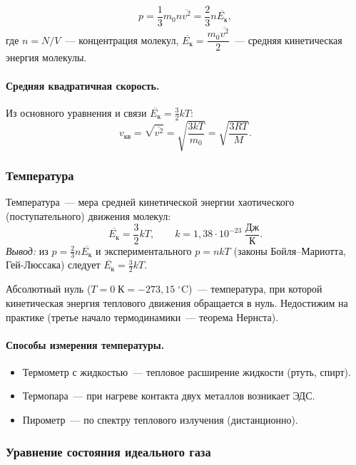 \documentclass[12pt]{article}
\begin{document}
\[
	\boxed{p = \frac{1}{3} m_0 n \overline{v^2} = \frac{2}{3} n \overline{E_{\text{к}}}},
\]
где $n = N/V$~--- концентрация молекул, $\overline{E_{\text{к}}} = \dfrac{m_0 \overline{v^2}}{2}$~--- средняя кинетическая энергия молекулы.

\paragraph{Средняя квадратичная скорость.}
Из основного уравнения и связи $\overline{E_{\text{к}}} = \frac{3}{2}kT$:
\[
	v_{\text{кв}} = \sqrt{\overline{v^2}} = \sqrt{\frac{3kT}{m_0}} = \sqrt{\frac{3RT}{M}}.
\]

\subsubsection{Температура}

\begin{definition}
	Температура~--- мера средней кинетической энергии хаотического (поступательного) движения молекул:
	\[
		\overline{E_{\text{к}}} = \frac{3}{2} kT, \qquad k = 1{,}38 \cdot 10^{-23} \; \frac{\text{Дж}}{\text{К}}.
	\]
	\textit{Вывод:} из $p = \frac{2}{3}n\overline{E_{\text{к}}}$ и экспериментального $p = nkT$ (законы Бойля--Мариотта, Гей-Люссака) следует $\overline{E_{\text{к}}} = \frac{3}{2}kT$.
\end{definition}

Абсолютный нуль ($T = 0 \; \text{К} = -273{,}15\;{^\circ}\text{C}$)~--- температура, при которой кинетическая энергия теплового движения обращается в нуль. Недостижим на практике (третье начало термодинамики~--- теорема Нернста).

\paragraph{Способы измерения температуры.}
\begin{itemize}
	\item Термометр с жидкостью~--- тепловое расширение жидкости (ртуть, спирт).
	\item Термопара~--- при нагреве контакта двух металлов возникает ЭДС.
	\item Пирометр~--- по спектру теплового излучения (дистанционно).
\end{itemize}

\subsubsection{Уравнение состояния идеального газа}
\end{document}

